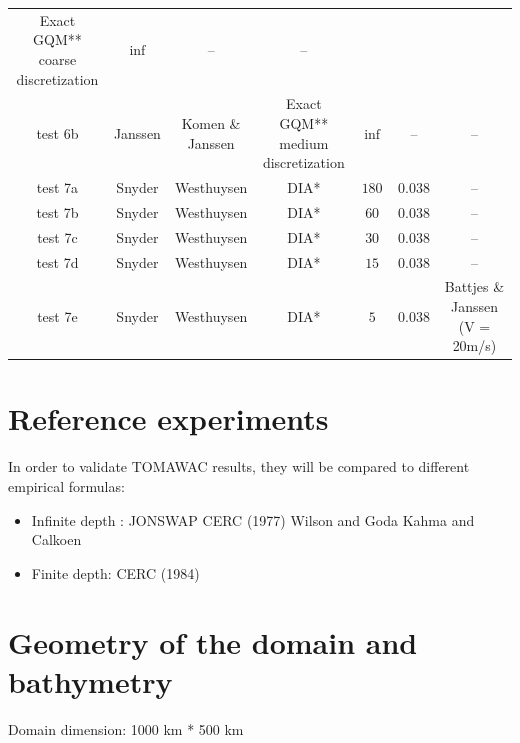\begin{table}[H]
\begin{center}
\begin{tabular*}{\linewidth}{@{\extracolsep{\fill}}ccccccc}
\minitab[c]{Exact GQM** \\ coarse \\ discretization} &
$\inf$ & -- & -- \\
test 6b  & Janssen \citep{Janssen1989,Janssen1991} &
\minitab[c]{Komen \citep{Komen1984} \& \\ Janssen \citep{Janssen1991}} &
\minitab[c]{Exact GQM** \\ medium \\ discretization} &
$\inf$ & -- & -- \\
\midrule
test 7a  & Snyder \citep{Snyder1981} &
Westhuysen \citep{Westhuys2007} &
DIA* & $180$ & $0.038$ & -- \\
test 7b  & Snyder \citep{Snyder1981} &
Westhuysen \citep{Westhuys2007} &
DIA* & $60$ & $0.038$ & -- \\
test 7c  & Snyder \citep{Snyder1981} &
Westhuysen \citep{Westhuys2007} &
DIA* & $30$ & $0.038$ & -- \\
test 7d  & Snyder \citep{Snyder1981} &
Westhuysen \citep{Westhuys2007} &
DIA* & $15$ & $0.038$ & -- \\
test 7e  & Snyder \citep{Snyder1981} &
Westhuysen \citep{Westhuys2007} &
DIA* & $5$ & $0.038$ & 
\minitab[c]{Battjes \& \\ Janssen \\ (V = 20m/s)} \\
\bottomrule
\bottomrule
\end{tabular*}
%
\end{center}
\end{table}

\section{Reference experiments}
In order to validate TOMAWAC results, they will be compared to different empirical formulas:
\begin{itemize}
\item Infinite depth :
\subitem JONSWAP \cite{Hasselmann1973}
\subitem CERC (1977) \cite{CERC77}
\subitem Wilson and Goda \cite{Wilson1965}
\subitem Kahma and Calkoen \cite{Kahma1992}
\item Finite depth:
\subitem CERC (1984)\cite{CERC84}
\end{itemize}

\section{Geometry of the domain and bathymetry}
Domain  dimension: 1000 km * 500 km

